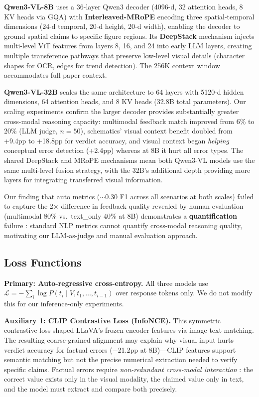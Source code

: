 \textbf{Qwen3-VL-8B} uses a 36-layer Qwen3 decoder (4096-d, 32 attention heads, 8 KV heads via GQA) with \textbf{Interleaved-MRoPE} encoding three spatial-temporal dimensions (24-d temporal, 20-d height, 20-d width), enabling the decoder to ground spatial claims to specific figure regions. Its \textbf{DeepStack} mechanism \citep{ge2024deepstack} injects multi-level ViT features from layers 8, 16, and 24 into early LLM layers, creating multiple transference pathways that preserve low-level visual details (character shapes for OCR, edges for trend detection). The 256K context window accommodates full paper context.

\textbf{Qwen3-VL-32B} scales the same architecture to 64 layers with 5120-d hidden dimensions, 64 attention heads, and 8 KV heads (32.8B total parameters). Our scaling experiments confirm the larger decoder provides substantially greater cross-modal reasoning capacity: multimodal feedback match improved from 6\% to 20\% (LLM judge, $n{=}50$), schematics' visual context benefit doubled from +9.4pp to +18.8pp for verdict accuracy, and visual context began \emph{helping} conceptual error detection (+2.4pp) whereas at 8B it hurt all error types. The shared DeepStack and MRoPE mechanisms mean both Qwen3-VL models use the same multi-level fusion strategy, with the 32B's additional depth providing more layers for integrating transferred visual information.

Our finding that auto metrics (${\sim}$0.30 F1 across all scenarios at both scales) failed to capture the 2$\times$ difference in feedback quality revealed by human evaluation (multimodal 80\% vs.\ text\_only 40\% at 8B) demonstrates a \textbf{quantification} failure \citep{Liang-foundations-2024}: standard NLP metrics cannot quantify cross-modal reasoning quality, motivating our LLM-as-judge and manual evaluation approach.

\subsection{ Loss Functions}

\textbf{Primary: Auto-regressive cross-entropy.} All three models use $\mathcal{L} = -\sum_i \log P(t_i \mid V, t_1, \ldots, t_{i-1})$ over response tokens only. We do not modify this for our inference-only experiments.

\textbf{Auxiliary 1: CLIP Contrastive Loss (InfoNCE).} This symmetric contrastive loss shaped LLaVA's frozen encoder features via image-text matching. The resulting coarse-grained alignment may explain why visual input hurts verdict accuracy for factual errors ($-$21.2pp at 8B)---CLIP features support semantic matching but not the precise numerical extraction needed to verify specific claims. Factual errors require \emph{non-redundant cross-modal interaction} \citep{Liang-foundations-2024}: the correct value exists only in the visual modality, the claimed value only in text, and the model must extract and compare both precisely.

